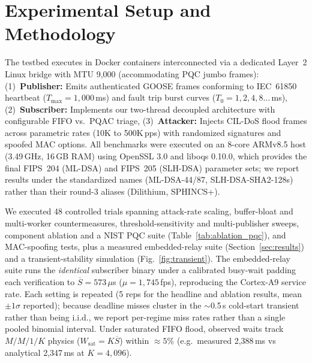 \documentclass[journal]{IEEEtran}
\begin{document}
\section{Experimental Setup and Methodology}
\label{sec:experiments}

The testbed executes in Docker containers interconnected via a dedicated Layer~2 Linux bridge with MTU 9,000 (accommodating PQC jumbo frames):
(1)~\textbf{Publisher:} Emits authenticated GOOSE frames conforming to IEC~61850 heartbeat ($T_{\max} = 1{,}000$\,ms) and fault trip burst curves ($T_0 = 1, 2, 4, 8\dots$\,ms),
(2)~\textbf{Subscriber:} Implements our two-thread decoupled architecture with configurable FIFO vs.\ PQAC triage,
(3)~\textbf{Attacker:} Injects CIL-DoS flood frames across parametric rates (10K to 500K\,pps) with randomized signatures and spoofed MAC options.
All benchmarks were executed on an 8-core ARMv8.5 host (3.49\,GHz, 16\,GB RAM) using OpenSSL 3.0 and liboqs 0.10.0, which provides the final FIPS~204 (ML-DSA) and FIPS~205 (SLH-DSA) parameter sets; we report results under the standardized names (ML-DSA-44/87, SLH-DSA-SHA2-128s) rather than their round-3 aliases (Dilithium, SPHINCS+).

We executed 48 controlled trials spanning attack-rate scaling, buffer-bloat and multi-worker countermeasures, threshold-sensitivity and multi-publisher sweeps, component ablation and a NIST PQC suite (Table~\ref{tab:ablation_pqc}), and MAC-spoofing tests, plus a measured embedded-relay suite (Section~\ref{sec:results}) and a transient-stability simulation (Fig.~\ref{fig:transient}). The embedded-relay suite runs the \emph{identical} subscriber binary under a calibrated busy-wait padding each verification to $\overline{S}=573\,\mu$s ($\mu=1{,}745$\,fps), reproducing the Cortex-A9 service rate. Each setting is repeated (5 reps for the headline and ablation results, mean $\pm 1\sigma$ reported); because deadline misses cluster in the $\sim$0.5\,s cold-start transient rather than being i.i.d., we report per-regime miss rates rather than a single pooled binomial interval. Under saturated FIFO flood, observed waits track $M/M/1/K$ physics ($W_{\text{sat}}=K\overline{S}$) within $\approx 5\%$ (e.g.\ measured 2{,}388\,ms vs analytical 2{,}347\,ms at $K=4{,}096$).

\end{document}
